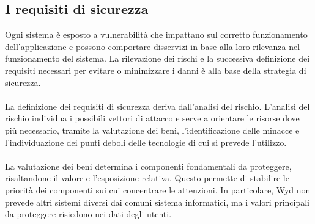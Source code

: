 \clearpage

\subsection{I requisiti di sicurezza}

Ogni sistema è esposto a vulnerabilità che impattano sul corretto funzionamento dell'applicazione
e possono comportare disservizi in base alla loro rilevanza nel funzionamento del sistema.
La rilevazione dei rischi e la successiva definizione dei requisiti necessari per evitare o minimizzare i danni 
è alla base della strategia di sicurezza.\\
\\
La definizione dei requisiti di sicurezza deriva dall'analisi del rischio.
L'analisi del rischio individua i possibili vettori di attacco e serve a orientare le risorse dove più necessario,
tramite la valutazione dei beni, l'identificazione delle minacce e
l'individuazione dei punti deboli delle tecnologie di cui si prevede l'utilizzo.\\
\\
La valutazione dei beni determina i componenti fondamentali da proteggere,
risaltandone il valore e l'esposizione relativa.
Questo permette di stabilire le priorità dei componenti sui cui concentrare le attenzioni.
In particolare, Wyd non prevede altri sistemi diversi dai comuni sistema informatici, 
ma i valori principali da proteggere risiedono nei dati degli utenti.\\
\\
